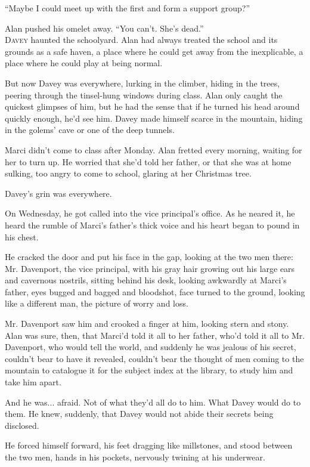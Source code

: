 \documentclass{article}
\begin{document}
``Maybe I could meet up with the first and form a support group?''

Alan pushed his omelet away.  ``You can't.  She's dead.''
\\
\lettrine[lines=3, lhang=.5, nindent=0pt, findent=2pt]{D}{avey} haunted the schoolyard.  Alan had always treated the school and
its grounds as a safe haven, a place where he could get away from the
inexplicable, a place where he could play at being normal.

But now Davey was everywhere, lurking in the climber, hiding in the
trees, peering through the tinsel-hung windows during class.  Alan
only caught the quickest glimpses of him, but he had the sense that if
he turned his head around quickly enough, he'd see him.  Davey made
himself scarce in the mountain, hiding in the golems' cave or one of
the deep tunnels.

Marci didn't come to class after Monday.  Alan fretted every morning,
waiting for her to turn up.  He worried that she'd told her father, or
that she was at home sulking, too angry to come to school, glaring at
her Christmas tree.

Davey's grin was everywhere.

On Wednesday, he got called into the vice principal's office.  As he
neared it, he heard the rumble of Marci's father's thick voice and his
heart began to pound in his chest.

He cracked the door and put his face in the gap, looking at the two
men there:  Mr.  Davenport, the vice principal, with his gray hair
growing out his large ears and cavernous nostrils, sitting behind his
desk, looking awkwardly at Marci's father, eyes bugged and bagged and
bloodshot, face turned to the ground, looking like a different man,
the picture of worry and loss.

Mr.  Davenport saw him and crooked a finger at him, looking stern and
stony.  Alan was sure, then, that Marci'd told it all to her father,
who'd told it all to Mr.  Davenport, who would tell the world, and
suddenly he was jealous of his secret, couldn't bear to have it
revealed, couldn't bear the thought of men coming to the mountain to
catalogue it for the subject index at the library, to study him and
take him apart.

And he was...  afraid.  Not of what they'd all do to him.  What Davey
would do to them.  He knew, suddenly, that Davey would not abide their
secrets being disclosed.

He forced himself forward, his feet dragging like millstones, and
stood between the two men, hands in his pockets, nervously twining at
his underwear.
\end{document}
